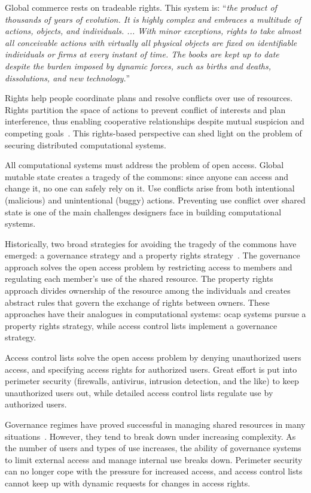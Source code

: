 \documentclass{llncs}
\begin{document}
Global commerce rests on tradeable rights. This system is: ``\emph{the product of thousands of years of evolution. It is highly complex and embraces a multitude of actions, objects, and individuals. ... With minor exceptions, rights to take almost all conceivable actions with virtually all physical objects are fixed on identifiable individuals or firms at every instant of time. The books are kept up to date despite the burden imposed by dynamic forces, such as births and deaths, dissolutions, and new technology.}''~\cite{jensen_specific_1995}

Rights help people coordinate plans and resolve conflicts over use of resources. Rights partition the space of actions to prevent conflict of interests and plan interference, thus enabling cooperative relationships despite mutual suspicion and competing goals~\cite{steiner_essay_1994}. This rights-based perspective can shed light on the problem of securing distributed computational systems.

All computational systems must address the problem of open access. Global mutable state creates a tragedy of the commons: since anyone can access and change it, no one can safely rely on it. Use conflicts arise from both intentional (malicious) and unintentional (buggy) actions. Preventing use conflict over shared state is one of the main challenges designers face in building computational systems.

Historically, two broad strategies for avoiding the tragedy of the commons have emerged: a governance strategy and a property rights strategy~\cite{smith_exclusion_2002}. The governance approach solves the open access problem by restricting access to members and regulating each member's use of the shared resource. The property rights approach divides ownership of the resource among the individuals and creates abstract rules that govern the exchange of rights between owners. These approaches have their analogues in computational systems: ocap systems pursue a property rights strategy, while access control lists implement a governance strategy.

Access control lists solve the open access problem by denying unauthorized users access, and specifying access rights for authorized users. Great effort is put into perimeter security (firewalls, antivirus, intrusion detection, and the like) to keep unauthorized users out, while detailed access control lists regulate use by authorized users.

Governance regimes have proved successful in managing shared resources in many situations~\cite{ostrom_governing_1990}. However, they tend to break down under increasing complexity. As the number of users and types of use increases, the ability of governance systems to limit external access and manage internal use breaks down. Perimeter security can no longer cope with the pressure for increased access, and access control lists cannot keep up with dynamic requests for changes in access rights.
\end{document}
